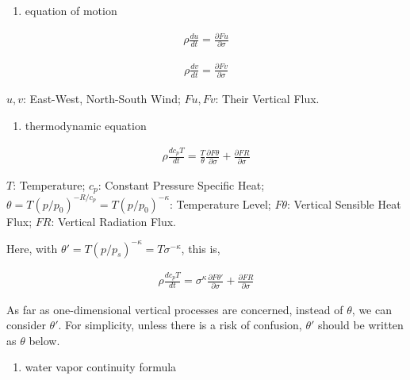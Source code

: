 \begin{enumerate}
\def\labelenumi{\arabic{enumi}.}
\tightlist
\item
  equation of motion
\end{enumerate}

\begin{eqnarray}
  \rho \frac{d {u}}{d {t}} = \frac{\partial{Fu}}{\partial {\sigma}}
\end{eqnarray}

\begin{eqnarray}
  \rho \frac{d {v}}{d {t}} = \frac{\partial{Fv}}{\partial {\sigma}}
\end{eqnarray}

\(u, v\): East-West, North-South Wind; \(Fu, Fv\): Their Vertical Flux.

\begin{enumerate}
\def\labelenumi{\arabic{enumi}.}
\setcounter{enumi}{1}
\tightlist
\item
  thermodynamic equation
\end{enumerate}

\begin{eqnarray}
  \rho \frac{d {c_p T}}{d {t}} = \frac{T}{\theta} \frac{\partial{F{\theta}}}{\partial {\sigma}}
                     + \frac{\partial{F{R}}}{\partial {\sigma}}
\end{eqnarray}

\(T\): Temperature; \(c_p\): Constant Pressure Specific Heat;
\(\theta=T(p/p_0)^{-R/c_p}=T(p/p_0)^{-\kappa}\): Temperature Level;
\(F\theta\): Vertical Sensible Heat Flux; \(FR\): Vertical Radiation
Flux.

Here, with \(\theta'=T(p/p_s)^{-\kappa}=T\sigma^{-\kappa}\), this is,

\begin{eqnarray}
  \rho \frac{d {c_p T}}{d {t}} = \sigma^\kappa \frac{\partial{F{\theta'}}}{\partial {\sigma}}
                     + \frac{\partial{F{R}}}{\partial {\sigma}}
\end{eqnarray}

As far as one-dimensional vertical processes are concerned, instead of
\(\theta\), we can consider \(\theta'\). For simplicity, unless there is
a risk of confusion, \(\theta'\) should be written as \(\theta\) below.

\begin{enumerate}
\def\labelenumi{\arabic{enumi}.}
\setcounter{enumi}{2}
\tightlist
\item
  water vapor continuity formula
\end{enumerate}

